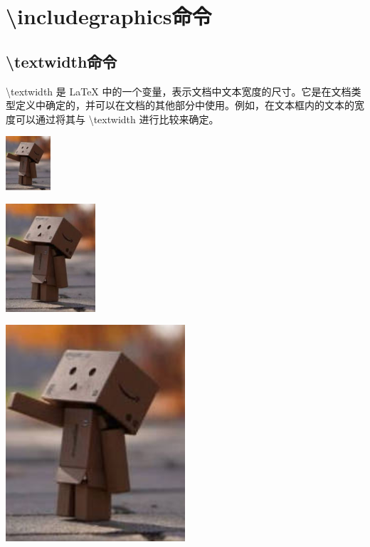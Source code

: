 \documentclass{article}
\begin{document}
	
	
	\section{\textbackslash includegraphics命令}
	\subsection{\textbackslash textwidth命令}
	\textbackslash textwidth 是 LaTeX 中的一个变量，表示文档中文本宽度的尺寸。它是在文档类型定义中确定的，并可以在文档的其他部分中使用。例如，在文本框内的文本的宽度可以通过将其与 \textbackslash textwidth 进行比较来确定。
	
	\includegraphics[width=0.125\textwidth]{test.jpg}
	
	\includegraphics[width=0.25\textwidth]{test.jpg}
	
	\includegraphics[width=0.5\textwidth]{test.jpg}
	
\end{document}
